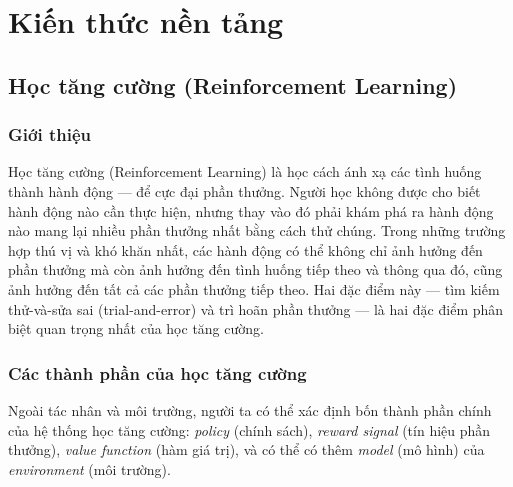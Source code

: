 \chapter{Kiến thức nền tảng}

\section{Học tăng cường (Reinforcement Learning)}

\subsection{Giới thiệu}
Học tăng cường (Reinforcement Learning) \cite{reinforcementlearninganintroduction} là học cách ánh xạ các tình huống thành hành động — để cực đại phần thưởng. Người học không được cho biết hành động nào cần thực hiện, nhưng thay vào đó phải khám phá ra hành động nào mang lại nhiều phần thưởng nhất bằng cách thử chúng. Trong những trường hợp thú vị và khó khăn nhất, các hành động có thể không chỉ ảnh hưởng đến phần thưởng mà còn ảnh hưởng đến tình huống tiếp theo và thông qua đó, cũng ảnh hưởng đến tất cả các phần thưởng tiếp theo. Hai đặc điểm này — tìm kiếm thử-và-sửa sai (trial-and-error) và trì hoãn phần thưởng — là hai đặc điểm phân biệt quan trọng nhất của học tăng cường.

\subsection{Các thành phần của học tăng cường}
Ngoài tác nhân và môi trường, người ta có thể xác định bốn thành phần chính của hệ thống học tăng cường: \textit{policy} (chính sách), \textit{reward signal} (tín hiệu phần thưởng), \textit{value function} (hàm giá trị), và có thể có thêm \textit{model} (mô hình) của \textit{environment} (môi trường).

